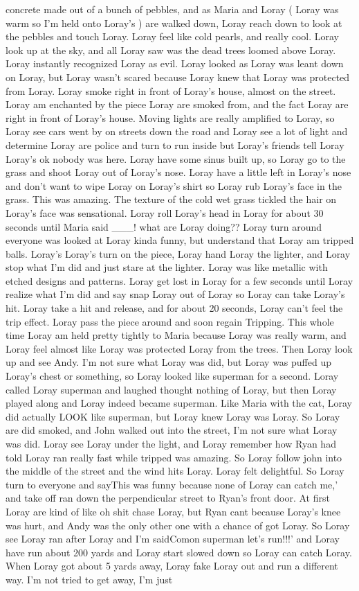 \documentclass[12pt]{book}
\begin{document}
concrete made out of a bunch of pebbles, and as Maria and Loray ( Loray was warm so I'm held onto Loray's ) are walked down, Loray reach down to look at the pebbles and touch Loray. Loray feel like cold pearls, and really cool. Loray look up at the sky, and all Loray saw was the dead trees loomed above Loray. Loray instantly recognized Loray as evil. Loray looked as Loray was leant down on Loray, but Loray wasn't scared because Loray knew that Loray was protected from Loray. Loray smoke right in front of Loray's house, almost on the street. Loray am enchanted by the piece Loray are smoked from, and the fact Loray are right in front of Loray's house. Moving lights are really amplified to Loray, so Loray see cars went by on streets down the road and Loray see a lot of light and determine Loray are police and turn to run inside but Loray's friends tell Loray Loray's ok nobody was here. Loray have some sinus built up, so Loray go to the grass and shoot Loray out of Loray's nose. Loray have a little left in Loray's nose and don't want to wipe Loray on Loray's shirt so Loray rub Loray's face in the grass. This was amazing. The texture of the cold wet grass tickled the hair on Loray's face was sensational. Loray roll Loray's head in Loray for about 30 seconds until Maria said \_\_\_! what are Loray doing?? Loray turn around everyone was looked at Loray kinda funny, but understand that Loray am tripped balls. Loray's Loray's turn on the piece, Loray hand Loray the lighter, and Loray stop what I'm did and just stare at the lighter. Loray was like metallic with etched designs and patterns. Loray get lost in Loray for a few seconds until Loray realize what I'm did and say snap Loray out of Loray so Loray can take Loray's hit. Loray take a hit and release, and for about 20 seconds, Loray can't feel the trip effect. Loray pass the piece around and soon regain Tripping. This whole time Loray am held pretty tightly to Maria because Loray was really warm, and Loray feel almost like Loray was protected Loray from the trees. Then Loray look up and see Andy. I'm not sure what Loray was did, but Loray was puffed up Loray's chest or something, so Loray looked like superman for a second. Loray called Loray superman and laughed thought nothing of Loray, but then Loray played along and Loray indeed became superman. Like Maria with the cat, Loray did actually LOOK like superman, but Loray knew Loray was Loray. So Loray are did smoked, and John walked out into the street, I'm not sure what Loray was did. Loray see Loray under the light, and Loray remember how Ryan had told Loray ran really fast while tripped was amazing. So Loray follow john into the middle of the street and the wind hits Loray. Loray felt delightful. So Loray turn to everyone and sayThis was funny because none of Loray can catch me,' and take off ran down the perpendicular street to Ryan's front door. At first Loray are kind of like oh shit chase Loray, but Ryan cant because Loray's knee was hurt, and Andy was the only other one with a chance of got Loray. So Loray see Loray ran after Loray and I'm saidComon superman let's run!!!' and Loray have run about 200 yards and Loray start slowed down so Loray can catch Loray. When Loray got about 5 yards away, Loray fake Loray out and run a different way. I'm not tried to get away, I'm just 
\end{document}
